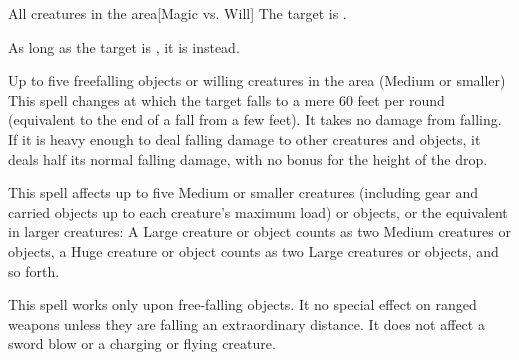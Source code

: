 \begin{spellheader}
    \spelldur{\durshort \dismissable}
\end{spellheader}
\begin{spelleffects}
    \begin{spelltarget}{All creatures in the area}[Magic vs. Will]
        \spellsuccess The target is \shaken.

        As long as the target is \bloodied, it is \frightened instead.
    \end{spelltarget}
\end{spelleffects}

\begin{spellheader}
\end{spellheader}
\begin{spelleffects}
    \begin{spelltargets}{Up to five freefalling objects or willing creatures in the area (Medium or smaller)}
        \spelleffect This spell changes at which the target falls to a mere 60 feet per round (equivalent to the end of a fall from a few feet). It takes no damage from falling. If it is heavy enough to deal falling damage to other creatures and objects, it deals half its normal falling damage, with no bonus for the height of the drop.
    \end{spelltargets}
\end{spelleffects}
\begin{spellfooter}
    \spellnotes This spell affects up to five Medium or smaller creatures (including gear and carried objects up to each creature's maximum load) or objects, or the equivalent in larger creatures: A Large creature or object counts as two Medium creatures or objects, a Huge creature or object counts as two Large creatures or objects, and so forth.

    This spell works only upon free-falling objects. It no special effect on ranged weapons unless they are falling an extraordinary distance. It does not affect a sword blow or a charging or flying creature.
\end{spellfooter}

